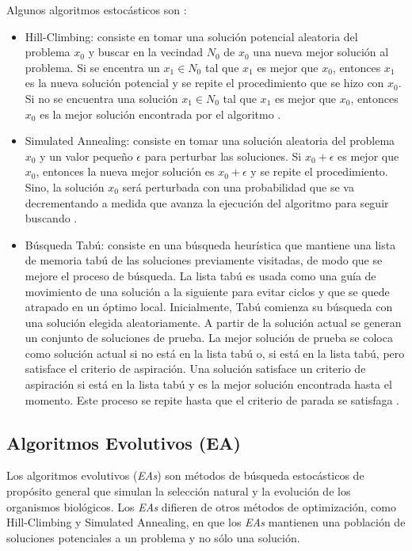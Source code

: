     Algunos algoritmos estocásticos son \cite{PSO_0}:
\begin{itemize}
    \item Hill-Climbing: consiste en tomar una solución potencial aleatoria del
problema $x_0$ y buscar en la vecindad $N_0$ de $x_0$ una nueva mejor solución
al problema. Si se encentra un $x_1 \in N_0$ tal que $x_1$ es mejor que $x_0$,
entonces $x_1$ es la nueva solución potencial y se repite el procedimiento que
se hizo con $x_0$. Si no se encuentra una solución $x_1 \in N_0$ tal que
$x_1$ es mejor que $x_0$, entonces $x_0$ es la mejor solución encontrada por el
algoritmo \cite{TA_1}.
    \item Simulated Annealing: consiste en tomar una solución aleatoria del
problema $x_0$ y un valor pequeño $\epsilon$ para perturbar las soluciones.
Si $x_0 + \epsilon$ es mejor que $x_0$, entonces la nueva mejor solución es 
$x_0 + \epsilon$ y se repite el procedimiento. Sino, la solución $x_0$ será
perturbada con una probabilidad que se va decrementando a medida que avanza la
ejecución del algoritmo para seguir buscando \cite{SA_2}.
    \item Búsqueda Tabú: consiste en una búsqueda heurística que mantiene una
lista de memoria tabú de las soluciones previamente visitadas, de modo que se
mejore el proceso de búsqueda. La lista tabú es usada como una guía de
movimiento de una solución a la siguiente para evitar ciclos \cite{SA_5} y que 
se quede atrapado en un óptimo local. Inicialmente, Tabú comienza su búsqueda
con una solución elegida aleatoriamente. A partir de la solución actual se
generan un conjunto de soluciones de prueba. La mejor solución de prueba se
coloca como solución actual si no está en la lista tabú o, si está en la lista
tabú, pero satisface el criterio de aspiración. Una solución satisface un
criterio de aspiración si está en la lista tabú y es la mejor solución
encontrada hasta el momento. Este proceso se repite hasta que el criterio de
parada se satisfaga \cite{SA_3}\cite{SA_4}.
\end{itemize}
    
\subsection{Algoritmos Evolutivos (EA)}
    Los algoritmos evolutivos (\emph{EAs}) son métodos de búsqueda estocásticos de
propósito general que simulan la selección natural y la evolución de los
organismos biológicos. Los \emph{EAs} difieren de otros métodos de optimización,
como Hill-Climbing y Simulated Annealing, en que los \emph{EAs} mantienen una
población de soluciones potenciales a un problema y no sólo una solución.

